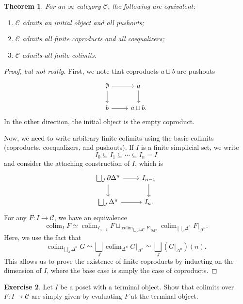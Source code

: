 \documentclass[10pt, oneside]{memoir}
\newtheorem{thm}{Theorem}[subsection]
\theoremstyle{definition}
\newtheorem{exer}[thm]{Exercise}
\theoremstyle{remark}
\theoremstyle{plain}
\theoremstyle{definition}
\theoremstyle{remark}
\newcommand{\mc}[1]{\mathcal{#1}}
\newcommand{\1}{\mathbf{1}}
\newcommand{\2}{\mathbf{2}}
\newcommand{\3}{\mathbf{3}}
\DeclareMathOperator*{\colim}{colim}
\begin{document}
\begin{thm}
    For an \(\infty \)-category \(\mc{C} \), the following are equivalent:
    \begin{enumerate}
        \item \(\mc{C} \) admits an initial object and all pushouts;
        \item \(\mc{C} \) admits all finite coproducts and all coequalizers;
        \item \(\mc{C} \) admits all finite colimits.
    \end{enumerate}
\end{thm}

\begin{proof}[Proof, but not really]
    First, we note that coproducts \(a \sqcup b \) are pushouts
    \begin{equation*}
    \begin{tikzcd}
        \emptyset \ar{r} \ar{d} & a \ar{d} \\
        b \ar{r} & a \sqcup b.
    \end{tikzcd}
    \end{equation*}
    In the other direction, the initial object is the empty coproduct.

    Now, we need to write arbitrary finite colimits using the basic colimits (coproducts, coequalizers, and pushouts). If \(I \) is a finite simplicial set, we write
    \[ I_0 \subseteq I_1 \subseteq \cdots \subseteq I_n = I \]
    and consider the attaching construction of \(I \), which is
    \begin{equation*}
    \begin{tikzcd}
        \bigsqcup_J \partial \Delta^n \ar{r} \ar{d} & I_{n-1} \ar{d} \\
        \bigsqcup_J \Delta^n \ar{r} & I_n.
    \end{tikzcd}
    \end{equation*}
    For any \(F \colon I \to \mc{C} \), we have an equivalence
    \[ \colim_I F \simeq \colim_{I_{n-1}} F \sqcup_{\colim_{\bigsqcup_J \partial \Delta^n} F|_{\partial \Delta^n}} \colim_{\bigsqcup_J \Delta^n} F|_{\Delta^n}. \]
    Here, we use the fact that
    \[ \colim_{\bigsqcup_J \Delta^n} G \simeq \bigsqcup_J \colim_{\Delta^n} G|_{\Delta^n} \simeq \bigsqcup_J (G|_{\Delta^n})(n). \]
    This allows us to prove the existence of finite coproducts by inducting on the dimension of \(I \), where the base case is simply the case of coproducts.
\end{proof}

\begin{exer}
    Let \(I \) be a poset with a terminal object. Show that colimits over \(F \colon I \to \mc{C} \) are simply given by evaluating \(F \) at the terminal object.
\end{exer}
\end{document}
